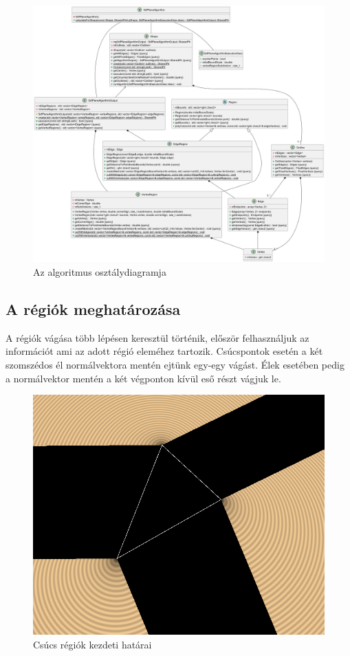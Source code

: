 \begin{figure}[H]
	\centering
	\includegraphics[width=1\linewidth]{images/class_algorithm.png}
	\caption{Az algoritmus osztálydiagramja}
	\label{fig:class_algorithm-1}
\end{figure}

\subsection{A régiók meghatározása}

A régiók vágása több lépésen keresztül történik, először felhasználjuk az információt ami az adott régió eleméhez tartozik. Csúcspontok esetén a két szomszédos él normálvektora mentén ejtünk egy-egy vágást. Élek esetében pedig a normálvektor mentén a két végponton kívül eső részt vágjuk le.

\begin{figure}[H]
	\centering
	\includegraphics[width=.6\linewidth]{images/initial_vertex_regions.png}
	\caption{Csúcs régiók kezdeti határai}
	\label{fig:initial_vertex_regions-1}
\end{figure}

